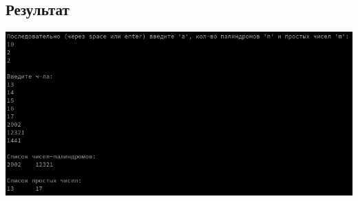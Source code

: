 \documentclass[a4paper]{article}
\begin{document}
\subsection{Результат}
\includegraphics[width=1\textwidth]{first/report/1.png}
\end{document}
